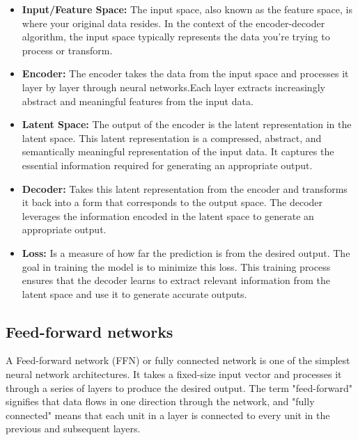\documentclass{article}
\begin{document}
\begin{itemize}
    \item \textbf{Input/Feature Space:} The input space, also known as the feature space, is where your original data resides. In the context of the encoder-decoder algorithm, the input space typically represents the data you're trying to process or transform.
    \item \textbf{Encoder:} The encoder takes the data from the input space and processes it layer by layer through neural networks.Each layer extracts increasingly abstract and meaningful features from the input data. 
    \item \textbf{Latent Space:} The output of the encoder is the latent representation in the latent space. This latent representation is a compressed, abstract, and semantically meaningful representation of the input data. It captures the essential information required for generating an appropriate output.
    \item \textbf{Decoder:} Takes this latent representation from the encoder and transforms it back into a form that corresponds to the output space. The decoder leverages the information encoded in the latent space to generate an appropriate output.
    \item \textbf{Loss:} Is a measure of how far the prediction is from the desired output. The goal in training the model is to minimize this loss. This training process ensures that the decoder learns to extract relevant information from the latent space and use it to generate accurate outputs.
\end{itemize}


\subsection{Feed-forward networks}
A Feed-forward network (FFN) or fully connected network is one of the simplest neural network architectures. 
It takes a fixed-size input vector and processes it through a series of layers to produce the desired output. 
The term "feed-forward" signifies that data flows in one direction through the network, and "fully connected" means that each unit in a layer is connected to every unit in the previous and subsequent layers.
\end{document}
